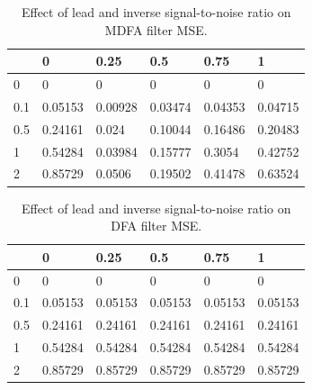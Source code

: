\documentclass[a4paper]{book}
\begin{document}
%

\begin{table}[]
\centering
\caption{Effect of lead and  inverse signal-to-noise ratio on MDFA filter MSE.}
\label{tab:critmdfa.mat}
\begin{tabular}{llllll}
  & 0    & 0.25   & 0.5  
   & 0.75  & 1  \\ \hline
0        & 0  & 0 
    & 0 & 0 & 0  \\
0.1        & 0.05153  & 0.00928 
    & 0.03474 & 0.04353 & 0.04715  \\
0.5        & 0.24161  & 0.024 
    & 0.10044 & 0.16486 & 0.20483  \\
1        & 0.54284  & 0.03984 
    & 0.15777 & 0.3054 & 0.42752  \\
2        & 0.85729  & 0.0506 
    & 0.19502 & 0.41478 & 0.63524  \\
\hline      
\end{tabular}
\end{table}
 
 
 \begin{table}[]
\centering
\caption{Effect of lead and  inverse signal-to-noise ratio on DFA filter MSE.}
\label{tab:critudfa.mat}
\begin{tabular}{llllll}
  & 0    & 0.25   & 0.5  
   & 0.75  & 1  \\ \hline
0        & 0  & 0 
    & 0 & 0 & 0  \\
0.1        & 0.05153  & 0.05153 
    & 0.05153 & 0.05153 & 0.05153  \\
0.5        & 0.24161  & 0.24161 
    & 0.24161 & 0.24161 & 0.24161  \\
1        & 0.54284  & 0.54284 
    & 0.54284 & 0.54284 & 0.54284  \\
2        & 0.85729  & 0.85729 
    & 0.85729 & 0.85729 & 0.85729  \\
\hline      
\end{tabular}
\end{table}
\end{document}
